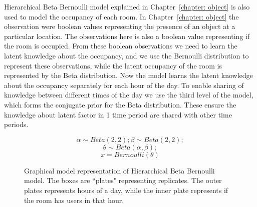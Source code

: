 Hierarchical Beta Bernoulli model explained in Chapter~\ref{chapter: object} is also used to model the occupancy of each room. In Chapter~\ref{chapter: object} the observation were boolean values representing the presence of an object at a particular location. The observations here is also a boolean value representing if the room is occupied. From these boolean observations we need to learn the latent knowledge about the occupancy, and we use the Bernoulli distribution to represent these observations, while the latent occupancy of the room is represented by the Beta distribution. 
Now the model learns the latent knowledge about the occupancy separately for each hour of the day. To enable sharing of knowledge between different times of the day we use the third level of the model, which forms the conjugate prior for the Beta distribution. These ensure the knowledge about latent factor in 1 time period are shared with other time periods. 

\noindent
\begin{figure}[htp]

\begin{minipage}{0.3\textwidth}
\centering


\end{minipage}%
\begin{minipage}{0.7\textwidth}

\begin{equation*}
	\alpha \sim Beta(2,2) ; \beta \sim Beta(2, 2);
\end{equation*}
\begin{equation*}
	\theta \sim Beta(\alpha, \beta);
\end{equation*}
\begin{equation*}
	x = Bernoulli(\theta)
\end{equation*}
\end{minipage}
\caption[Hierarchical Beta Bernoulli graphical model]{Graphical model representation of Hierarchical Beta Bernoulli model. The boxes are ``plates" representing replicates. The outer plates represents hours of a day, while the inner plate represents if the room has users in that hour.}
\label{bbm2}
\end{figure}



